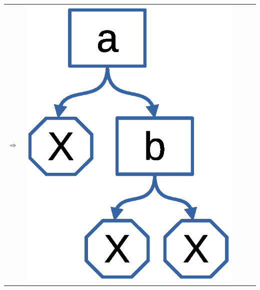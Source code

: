 \documentclass{../../slides-style}
\begin{document}
\begin{frame}
\begin{tabular}{m{25mm}cm{25mm}cm{25mm}}
    \textbf{\Huge $\Rightarrow$} &
    \pause
    \includegraphics[scale=0.4]{term4.eps}
    \end{tabular}
    \end{frame}
\end{document}
